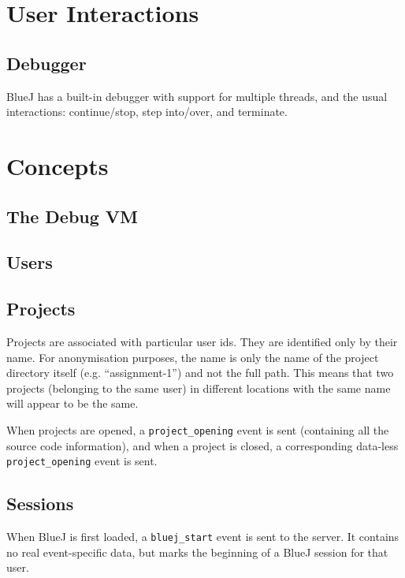\documentclass{book}
\begin{document}
\chapter{User Interactions}


\section{Debugger}

BlueJ has a built-in debugger with support for multiple threads, and the usual
interactions: continue/stop, step into/over, and terminate.

\chapter{Concepts}

\section{The Debug VM}

\section{Users}

\section{Projects}

Projects are associated with particular user ids.  They are identified only by
their name.  For anonymisation purposes, the name is only the name of the
project directory itself (e.g. ``assignment-1'') and not the full path.  This
means that two projects (belonging to the same user) in different locations with the same name will appear
to be the same.

When projects are opened, a \texttt{project\_opening} event is sent
(containing all the source code information), and when
a project is closed, a corresponding data-less \texttt{project\_opening} event
is sent.

\section{Sessions}
\label{def:sequence_id}

When BlueJ is first loaded, a \texttt{bluej\_start} event is sent to the
server.  It contains no real event-specific data, but marks the beginning of a
BlueJ session for that user.
\end{document}
